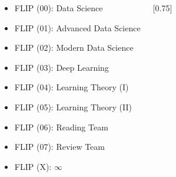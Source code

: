 \documentclass{tikzposter} %
\begin{document}
\begin{columns}
{\begin{minipage}[l]{0.6\linewidth}
{\begin{tikzpicture}[ every annotation/.style = {draw,
						fill = white}]
					\end{tikzpicture}
				}
			\end{minipage}
			\hfill
			\hspace{0.03\textwidth}
			\begin{minipage}[l]{0.4\linewidth}
				\vspace{-30pt}
				\begin{center}
					\begin{description}[font=\small]			
						\item[Flipper] \hfill
						\begin{itemize}
							\footnotesize
							\item FLIP (00): Data Science
							\item FLIP (01): Advanced Data Science
						\end{itemize}
						\item[Trainee] \hfill
						\begin{itemize}
							\footnotesize
							\item FLIP (02): Modern Data Science
							\item FLIP (03): Deep Learning
						\end{itemize}
						\item[$\infty$] \hfill
						\begin{itemize}
							\footnotesize
							\item FLIP (04): Learning Theory (I)
							\item FLIP (05): Learning Theory (II)
							\item FLIP (06): Reading Team
							\item FLIP (07): Review Team
							\item FLIP (X): $\infty$
						\end{itemize}
					\end{description}
				\end{center}				
			\end{minipage}
		}
		
		
		
		
		{
			\begin{minipage}[l]{0.55\linewidth}
				\scalebox{0.7}[0.75]{
					
}
\end{minipage}}
\end{columns}
\end{document}
